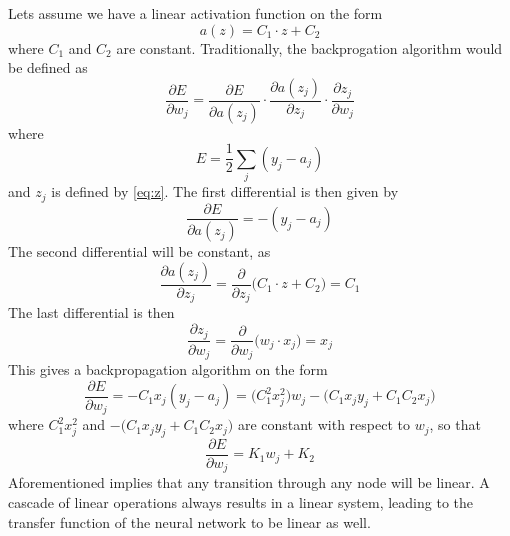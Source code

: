 \documentclass[../main.tex]{subfiles}
\begin{document}
Lets assume we have a linear activation function on the form
\begin{equation}
	a(z) = C_1 \cdot z + C_2
\end{equation}
where $C_1$ and $C_2$ are constant. Traditionally, the backprogation algorithm would be defined as
\begin{equation}
	\frac{\partial E}{\partial w_j} = 
	\frac{\partial E}{\partial a(z_j)}
	\cdot\frac{\partial a(z_j)}{\partial z_j}
	\cdot\frac{\partial z_j}{\partial w_j}
\end{equation}
where
\begin{equation}
	E=\frac{1}{2}\sum_{j}(y_j-a_j)
\end{equation}
and $z_j$ is defined by \autoref{eq:z}. The first differential is then given by
\begin{equation}
	\frac{\partial E}{\partial a(z_j)} = -(y_j-a_j)
\end{equation}
The second differential will be constant, as
\begin{equation}
	\frac{\partial a(z_j)}{\partial z_j} = \frac{\partial}{\partial z_j} \big( C_1 \cdot z + C_2 \big) = C_1
\end{equation}
The last differential is then
\begin{equation}
	\frac{\partial z_j}{\partial w_j} = \frac{\partial}{\partial w_j}\big( w_j \cdot x_j \big) = x_j
\end{equation}
This gives a backpropagation algorithm on the form
\begin{equation}
	\frac{\partial E}{\partial w_j} = -C_1x_j(y_j-a_j) =  \big(C_1^2 x_j^2\big) w_j - \big(C_1x_jy_j+C_1C_2x_j)
\end{equation}
where $C_1^2 x_j^2$ and $- \big(C_1x_jy_j+C_1C_2x_j)$ are constant with respect to $w_j$, so that
\begin{equation}
	\frac{\partial E}{\partial w_j} = K_1 w_j + K_2
\end{equation}
Aforementioned implies that any transition through any node will be linear. A cascade of linear operations always results in a linear system, leading to the transfer function of the neural network to be linear as well.
\end{document}
